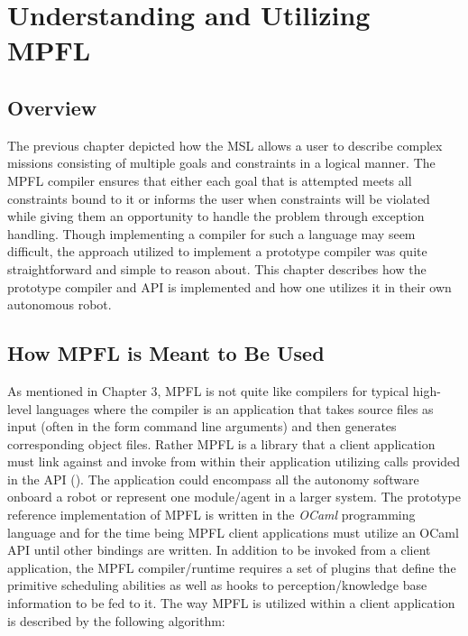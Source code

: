 \chapter{Understanding and Utilizing MPFL}

\section{Overview}
The previous chapter depicted how the MSL allows a user to describe complex missions consisting of multiple goals and constraints in a logical manner. The MPFL compiler ensures that either each goal that is attempted meets all constraints bound to it or informs the user when constraints will be violated while giving them an opportunity to handle the problem through exception handling. Though implementing a compiler for such a language may seem difficult, the approach utilized to implement a prototype compiler was quite straightforward and simple to reason about. This chapter describes how the prototype compiler and API is implemented and how one utilizes it in their own autonomous robot. 

\section{How MPFL is Meant to Be Used}
As mentioned in Chapter 3, MPFL is not quite like compilers for typical high-level languages where the compiler is an application that takes source files as input (often in the form command line arguments) and then generates corresponding object files. Rather MPFL is a library that a client application must link against and invoke from within their application utilizing calls provided in the API (). The application could encompass all the autonomy software onboard a robot or represent one module/agent in a larger system. The prototype reference implementation of MPFL is written in the \textit{OCaml} programming language and for the time being MPFL client applications must utilize an OCaml API until other bindings are written. In addition to be invoked from a client application, the MPFL compiler/runtime requires a set of plugins that define the primitive scheduling abilities as well as hooks to perception/knowledge base information to be fed to it. The way MPFL is utilized within a client application is described by the following algorithm:


